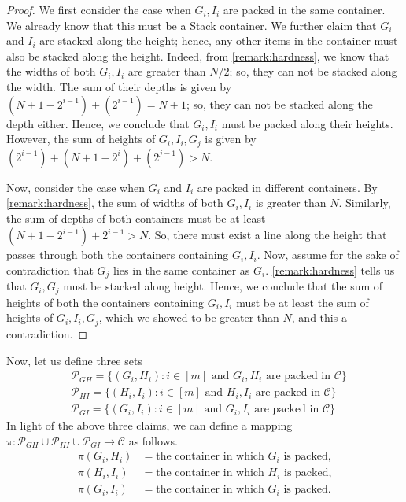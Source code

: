 \begin{proof}
    We first consider the case when $G_i,I_i$ are packed in the same container.
    We already know that this must be a Stack container. We further claim that $G_i$ and $I_i$ are stacked along the height; hence, any other items in the container must also be stacked along the height.
    Indeed, from \cref{remark:hardness}, we know that the widths of both $G_i,I_i$ are greater than $N/2$; so, they can not be stacked along the width. The sum of their depths is given by $(N+1-2^{i-1})+(2^{i-1})=N+1$; so, they can not be stacked along the depth either. Hence, we conclude that $G_i,I_i$ must be packed along their heights. However, the sum of heights of $G_i,I_i,G_j$ is given by $(2^{i-1})+(N+1-2^{i})+(2^{j-1})>N$.

    Now, consider the case when $G_i$ and $I_i$ are packed in different containers.
    By \cref{remark:hardness}, the sum of widths of both $G_i,I_i$ is greater than $N$. Similarly, the sum of depths of both containers must be at least $(N+1-2^{i-1})+2^{i-1}>N$.
    So, there must exist a line along the height that passes through both the containers containing $G_i,I_i$.
    Now, assume for the sake of contradiction that $G_j$ lies in the same container as $G_i$. \cref{remark:hardness} tells us that $G_i,G_j$ must be stacked along height.
    Hence, we conclude that the sum of heights of both the containers containing $G_i,I_i$ must be at least the sum of heights of $G_i,I_i,G_j$, which we showed to be greater than $N$,
    and this a contradiction.
\end{proof}
Now, let us define three sets
\begin{align*}
    &\mathcal P_{GH}=\{(G_i,H_i):i\in[m]\text{ and }G_i,H_i\text{ are packed in $\mathcal C$}\}\\
    &\mathcal P_{HI}=\{(H_i,I_i):i\in[m]\text{ and }H_i,I_i\text{ are packed in $\mathcal C$}\}\\
    &\mathcal P_{GI}=\{(G_i,I_i):i\in[m]\text{ and }G_i,I_i\text{ are packed in $\mathcal C$}\}
\end{align*}
In light of the above three claims, we can define a mapping $\pi:\mathcal P_{GH}\cup \mathcal P_{HI}\cup \mathcal P_{GI}\to \mathcal C$ as follows.
\begin{align*}
    \pi(G_i,H_i) &= \text{the container in which }G_i\text{ is packed,}\\
    \pi(H_i,I_i) &= \text{the container in which }H_i\text{ is packed,}\\
    \pi(G_i,I_i) &= \text{the container in which }G_i\text{ is packed.}
\end{align*}
